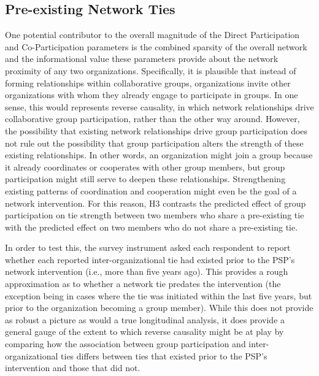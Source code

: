 \documentclass[12pt,a4paper,titlepage]{article}
\begin{document}
\subsection{Pre-existing Network Ties}

One potential contributor to the overall magnitude of the Direct Participation and Co-Participation parameters is the combined sparsity of the overall network and the informational value these parameters provide about the network proximity of any two organizations. Specifically, it is plausible that instead of forming relationships within collaborative groups, organizations invite other organizations with whom they already engage to participate in groups. In one sense, this would represents reverse causality, in which network relationships drive collaborative group participation, rather than the other way around. However, the possibility that existing network relationships drive group participation does not rule out the possibility that group participation alters the strength of these existing relationships. In other words, an organization might join a group because it already coordinates or cooperates with other group members, but group participation might still serve to deepen these relationships. Strengthening existing patterns of coordination and cooperation might even be the goal of a network intervention. For this reason, H3 contrasts the predicted effect of group participation on tie strength between two members who share a pre-existing tie with the predicted effect on two members who do not share a pre-existing tie. 

\singlespacing

\doublespacing

In order to test this, the survey instrument asked each respondent to report whether each reported inter-organizational tie had existed prior to the PSP’s network intervention (i.e., more than five years ago). This provides a rough approximation as to whether a network tie predates the intervention (the exception being in cases where the tie was initiated within the last five years, but prior to the organization becoming a group member). While this does not provide as robust a picture as would a true longitudinal analysis, it does provide a general gauge of the extent to which reverse causality might be at play by comparing how the association between group participation and inter-organizational ties differs between ties that existed prior to the PSP’s intervention and those that did not.
\end{document}
